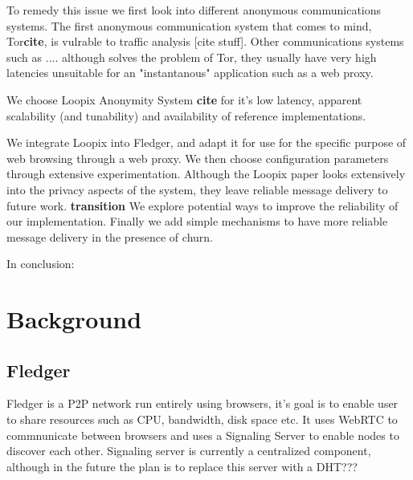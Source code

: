 \documentclass[a4paper,11pt,oneside]{report}
\begin{document}
To remedy this issue we first look into different anonymous communications systems. The first anonymous communication system that comes to mind, Tor\textbf{cite}, is vulrable to traffic analysis [cite stuff].
Other communications systems such as .... although solves the problem of Tor, they usually have very high latencies unsuitable for an "instantanous" application such as a web proxy.

We choose Loopix Anonymity System \textbf{cite} for it's low latency, apparent scalability (and tunability) and availability of reference implementations.

We integrate Loopix into Fledger, and adapt it for use for the specific purpose of web browsing through a web proxy. We then choose configuration parameters through extensive experimentation. Although the Loopix paper looks extensively into the privacy aspects of the system, they leave reliable message delivery to future work. \textbf{transition} We explore potential ways to improve the reliability of our implementation. Finally we add simple mechanisms to have more reliable message delivery in the presence of churn.

In conclusion:


\chapter{Background}



\section{Fledger}
Fledger is a P2P network run entirely using browsers, it's goal is to enable user to share resources such as CPU, bandwidth, disk space etc. It uses WebRTC to commnunicate between browsers and uses a Signaling Server to enable nodes to discover each other. Signaling server is currently a centralized component, although in the future the plan is to replace this server with a DHT???
\end{document}
